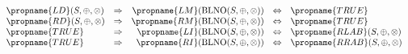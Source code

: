 \[
\begin{array}{lcrcl} 
\propname{LD}(S, \oplus, \otimes)
	& \Rightarrow
	& \propname{LM}(\mathrm{BLNO}(S,\oplus,\otimes))
    & \Leftrightarrow
    & \propname{TRUE} \\
\propname{RD}(S, \oplus, \otimes)
	& \Rightarrow
	& \propname{RM}(\mathrm{BLNO}(S,\oplus,\otimes))
    & \Leftrightarrow %
    & \propname{TRUE} \\
\propname{TRUE}
	& \Rightarrow
	& \propname{LI}(\mathrm{BLNO}(S,\oplus,\otimes))
    & \Leftrightarrow %
    & \propname{RLAB}(S,\oplus,\otimes) \\ 
\propname{TRUE}
	& \Rightarrow
	& \propname{RI}(\mathrm{BLNO}(S,\oplus,\otimes))
    & \Leftrightarrow %
    & \propname{RRAB}(S,\oplus,\otimes) \\
\end{array} 
\] 
